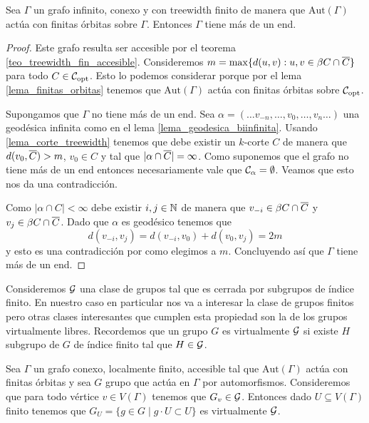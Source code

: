 \documentclass[tesis.tex]{subfiles}
\newcommand{\aut}{\text{Aut}}
\begin{document}
\begin{lema}\label{lema_tw_mas_1_end}
	Sea $\Gamma$ un grafo infinito, conexo y con treewidth finito de manera que $\aut(\Gamma)$ actúa con finitas órbitas sobre $\Gamma$.
	Entonces $\Gamma$ tiene más de un end.
\end{lema}
\begin{proof}
	Este grafo resulta ser accesible por el teorema \ref{teo_treewidth_fin_accesible}.
	Consideremos $m = \max \{  d(u,v) : u,v \in \beta C \cap \overline C \}$ para todo $C \in {\cal C}_{\text{opt}}$.
	Esto lo podemos considerar porque por el lema \ref{lema_finitas_orbitas} tenemos que $\aut(\Gamma)$ actúa con finitas órbitas sobre ${\cal C}_{\text{opt}}$.
	
	Supongamos que $\Gamma$ no tiene más de un end.
	Sea $\alpha = (\dots v_{-n}, \dots, v_{0}, \dots, v_{n} \dots)$ una geodésica infinita como en el lema \ref{lema_geodesica_biinfinita}.
	Usando \ref{lema_corte_treewidth} tenemos que debe existir un $k$-corte $C$ de manera que $d(v_{0}, \overline C) > m$, $v_{0} \in C$ y tal que $|\alpha \cap \overline C|=\infty$.
	Como suponemos que el grafo no tiene más de un end entonces necesariamente vale que ${\cal{C}}_{\alpha} = \emptyset$. 
	Veamos que esto nos da una contradicción.
	
	Como $|\alpha \cap C| < \infty$ debe existir $i,j \in \mathbb{N}$ de manera que $v_{-i} \in \beta C \cap \overline C$ y $v_{j} \in \beta C \cap \overline C$.
	Dado que $\alpha$ es geodésico tenemos que
	\[
		d(v_{-i},v_{j}) = d(v_{-i},v_{0}) + d(v_{0}, v_{j}) = 2m
	\]
	y esto es una contradicción por como elegimos a $m$. 
	Concluyendo así que $\Gamma$ tiene más de un end.
	
\end{proof}

Consideremos ${\cal G}$ una clase de grupos tal que es cerrada por subgrupos de índice finito.
En nuestro caso en particular nos va a interesar la clase de grupos finitos pero otras clases interesantes que cumplen esta propiedad son la de los grupos virtualmente libres.
Recordemos que un grupo $G$ es virtualmente ${\cal G}$ si existe $H$ subgrupo de $G$ de índice finito tal que $H \in {\cal G}$.

\begin{lema}\label{lema_accion_virtualmente_g}
	Sea $\Gamma$ un grafo conexo, localmente finito, accesible tal que $\aut(\Gamma)$ actúa con finitas órbitas y sea $G$ grupo que actúa en $\Gamma$ por automorfismos.
	Consideremos que para todo vértice $v \in V(\Gamma)$ tenemos que $G_{v} \in {\cal G}$.
	Entonces dado $U \subseteq V(\Gamma)$ finito tenemos que $G_{U} = \{ g \in G \mid g \cdot { U} \subset { U} \}$ es virtualmente ${\cal G}$.
\end{lema}
\end{document}

